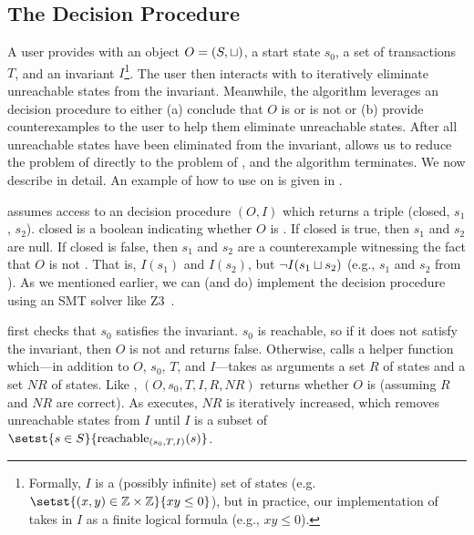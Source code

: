 \subsection{The Decision Procedure}
A user provides  with an object $O = (S,
\sqcup)$, a start state $s_0$, a set of transactions $T$, and an invariant
$I$\footnote{%
  Formally, $I$ is a (possibly infinite) set of states (e.g. $\setst{(x, y) \in
  \ints \times \ints}{xy \leq 0}$), but in practice, our implementation of
  \IsInvConfluent{} takes in $I$ as a finite logical formula (e.g., $xy \leq
  0$).
}. The user then interacts with
 to iteratively eliminate unreachable
states from the invariant. Meanwhile, the algorithm leverages an
\invariantclosure{} decision procedure to either (a) conclude that $O$ is or is
not \sTIconfluent{} or (b) provide counterexamples to the user to help them
eliminate unreachable states. After all unreachable states have been eliminated
from the invariant,  allows us to reduce
the problem of \invariantconfluence{} directly to the problem of
\invariantclosure{}, and the algorithm terminates.
%
We now describe  in detail. An example of
how to use  on  is given
in .

{}

\IsInvConfluent{} assumes access to an \invariantclosure{} decision procedure
\IsIclosed$(O, I)$ which returns a triple (closed, $s_1$, $s_2$). closed is a
boolean indicating whether $O$ is \Iclosed{}. If closed is true, then $s_1$ and
$s_2$ are null. If closed is false, then $s_1$ and $s_2$ are a counterexample
witnessing the fact that $O$ is not \Iclosed{}. That is, $I(s_1)$ and $I(s_2)$,
but $\lnot I(s_1 \sqcup s_2)$ (e.g., $s_1$ and $s_2$ from ).  As
we mentioned earlier, we can (and do) implement the \invariantclosure{}
decision procedure using an SMT solver like Z3~\cite{de2008z3}.

\IsInvConfluent{} first checks that $s_0$ satisfies the invariant. $s_0$ is
reachable, so if it does not satisfy the invariant, then $O$ is not
\sTIconfluent{} and \IsInvConfluent{} returns false. Otherwise,
\IsInvConfluent{} calls a helper function \Helper{} which---in addition to $O$,
$s_0$, $T$, and $I$---takes as arguments a set $R$ of \sTIreachable{} states
and a set $NR$ of \sTIunreachable{} states. Like \IsInvConfluent, \Helper$(O,
s_0, T, I, R, NR)$ returns whether $O$ is \sTIconfluent{} (assuming $R$ and
$NR$ are correct).  As  executes, $NR$ is
iteratively increased, which removes unreachable states from $I$ until $I$ is a
subset of $\setst{s \in S}{\sTIreachablepredicate{s}}$.

